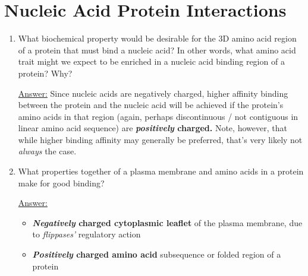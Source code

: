 \documentclass{article}
\newenvironment{QandA}{\begin{enumerate}[label=\bfseries Q\arabic*.]}
                       {\end{enumerate}}
\newenvironment{answered}{\par\normalfont\underline{Answer:}}{}
\begin{document}
\section{Nucleic Acid Protein Interactions}
\begin{QandA}
  \item{What biochemical property would be desirable for the 3D amino acid region of a protein that must bind a nucleic acid? In other words, what amino acid trait might we expect to be enriched in a nucleic acid binding region of a protein? Why?}
    \begin{answered}
    Since nucleic acids are negatively charged, higher affinity binding between the protein and the nucleic acid will be achieved if the protein's amino acids in that region (again, perhaps discontinuous / not contiguous in linear amino acid sequence) are \textbf{\textit{positively} charged.} Note, however, that while higher binding affinity may generally be preferred, that's very likely not \textit{always} the case.
    \end{answered}
  \item{What properties together of a plasma membrane and amino acids in a protein make for good binding?}
    \begin{answered}
    \begin{itemize}
      \item{\textbf{\textit{Negatively} charged cytoplasmic leaflet} of the plasma membrane, due to \textit{flippases'} regulatory action}
      \item{\textbf{\textit{Positively} charged amino acid} subsequence or folded region of a protein}
    \end{itemize}
    \end{answered}
\end{QandA}
\end{document}
